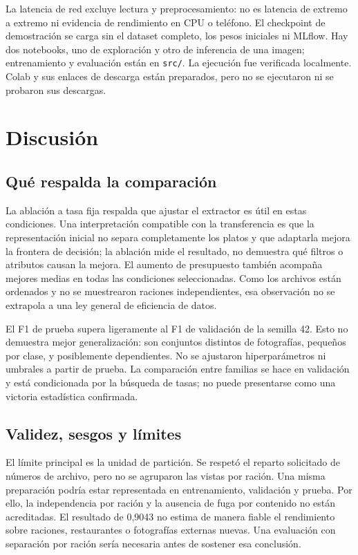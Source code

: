 \documentclass[conference]{IEEEtran}
\newcommand{\artifact}[1]{\texttt{\small #1}}
\begin{document}
La latencia de red excluye lectura y preprocesamiento: no es latencia de extremo a extremo ni evidencia de rendimiento en CPU o teléfono. El checkpoint de demostración se carga sin el dataset completo, los pesos iniciales ni MLflow. Hay dos notebooks, uno de exploración y otro de inferencia de una imagen; entrenamiento y evaluación están en \artifact{src/}. La ejecución fue verificada localmente. Colab y sus enlaces de descarga están preparados, pero no se ejecutaron ni se probaron sus descargas.

\section{Discusión}
\subsection{Qué respalda la comparación}
La ablación a tasa fija respalda que ajustar el extractor es útil en estas condiciones. Una interpretación compatible con la transferencia es que la representación inicial no separa completamente los platos y que adaptarla mejora la frontera de decisión; la ablación mide el resultado, no demuestra qué filtros o atributos causan la mejora. El aumento de presupuesto también acompaña mejores medias en todas las condiciones seleccionadas. Como los archivos están ordenados y no se muestrearon raciones independientes, esa observación no se extrapola a una ley general de eficiencia de datos.

El F1 de prueba supera ligeramente al F1 de validación de la semilla 42. Esto no demuestra mejor generalización: son conjuntos distintos de fotografías, pequeños por clase, y posiblemente dependientes. No se ajustaron hiperparámetros ni umbrales a partir de prueba. La comparación entre familias se hace en validación y está condicionada por la búsqueda de tasas; no puede presentarse como una victoria estadística confirmada.

\subsection{Validez, sesgos y límites}
El límite principal es la unidad de partición. Se respetó el reparto solicitado de números de archivo, pero no se agruparon las vistas por ración. Una misma preparación podría estar representada en entrenamiento, validación y prueba. Por ello, la independencia por ración y la ausencia de fuga por contenido no están acreditadas. El resultado de 0,9043 no estima de manera fiable el rendimiento sobre raciones, restaurantes o fotografías externas nuevas. Una evaluación con separación por ración sería necesaria antes de sostener esa conclusión.
\end{document}
